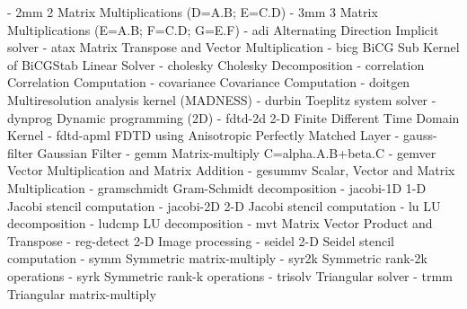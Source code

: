 - 2mm	2 Matrix Multiplications (D=A.B; E=C.D)\newline
- 3mm	3 Matrix Multiplications (E=A.B; F=C.D; G=E.F)\newline
- adi	Alternating Direction Implicit solver\newline
- atax	Matrix Transpose and Vector Multiplication\newline
- bicg	BiCG Sub Kernel of BiCGStab Linear Solver\newline
- cholesky	Cholesky Decomposition\newline
- correlation	Correlation Computation\newline
- covariance	Covariance Computation\newline
- doitgen	Multiresolution analysis kernel (MADNESS)\newline
- durbin	Toeplitz system solver\newline
- dynprog	Dynamic programming (2D)\newline
- fdtd-2d	2-D Finite Different Time Domain Kernel\newline
- fdtd-apml	FDTD using Anisotropic Perfectly Matched Layer\newline
- gauss-filter	Gaussian Filter\newline
- gemm	Matrix-multiply C=alpha.A.B+beta.C\newline
- gemver	Vector Multiplication and Matrix Addition\newline
- gesummv	Scalar, Vector and Matrix Multiplication\newline
- gramschmidt	Gram-Schmidt decomposition\newline
- jacobi-1D	1-D Jacobi stencil computation\newline
- jacobi-2D	2-D Jacobi stencil computation\newline
- lu	LU decomposition\newline
- ludcmp	LU decomposition\newline
- mvt	Matrix Vector Product and Transpose\newline
- reg-detect	2-D Image processing\newline
- seidel	2-D Seidel stencil computation\newline
- symm	Symmetric matrix-multiply\newline
- syr2k	Symmetric rank-2k operations\newline
- syrk	Symmetric rank-k operations\newline
- trisolv	Triangular solver\newline
- trmm	Triangular matrix-multiply\newline

